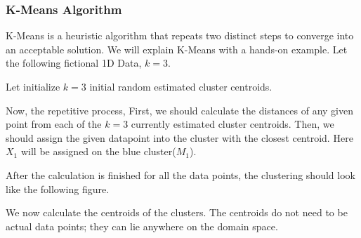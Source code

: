 \documentclass[11pt]{article}
\begin{document}
			\subsubsection*{K-Means Algorithm}
				K-Means is a heuristic algorithm that repeats two distinct steps to converge into an acceptable solution. We will explain K-Means with a hands-on example. Let the following fictional 1D Data, $k=3$.

				Let initialize $k=3$ initial random estimated cluster centroids.

				Now, the repetitive process, First, we should calculate the distances of any given point from each of the $k=3$ currently estimated cluster centroids. Then, we should assign the given datapoint into the cluster with the closest centroid. Here $X_1$ will be assigned on the blue cluster($M_1$).

				After the calculation is finished for all the data points, the clustering should look like the following figure.

				We now calculate the centroids of the clusters. The centroids do not need to be actual data points; they can lie anywhere on the domain space.
\end{document}
